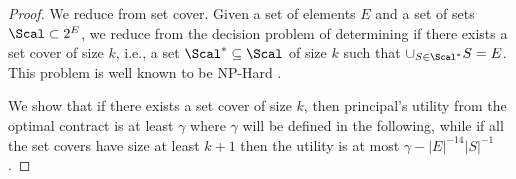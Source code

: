 \begin{proof}
	We reduce from set cover.
	Given a set of elements $E$ and a set of sets $\Scal \subset 2^E$, we reduce from the decision problem of determining if there exists a set cover of size $k$, i.e., a set $\Scal^*\subseteq \Scal$ of size $k$ such that 
	$\cup_{S \in \Scal^*} S=E$. This problem is well known to be NP-Hard \cite{feige..}.
	
	We show that if there exists a set cover of size $k$, then principal's utility from the optimal contract is at least $\gamma$ where $\gamma$ will be defined in the following, while if all the set covers have size at least $k+1$ then the utility is at most $\gamma-|E|^{-14}|S|^{-1}$.

%	
%	
%	
%	
	

\end{proof}
